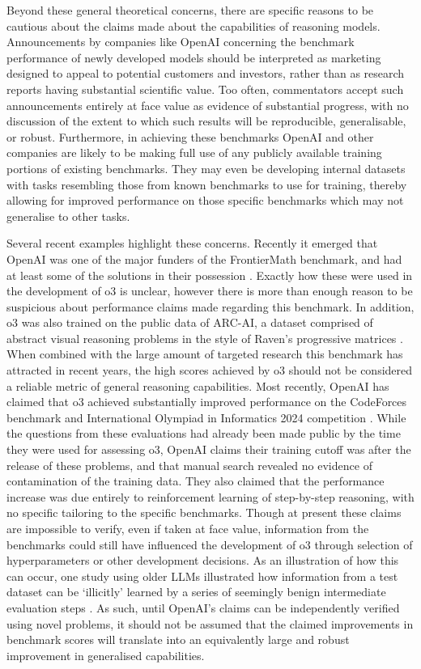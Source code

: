 \documentclass{article}
\begin{document}
Beyond these general theoretical concerns, there are specific reasons to be cautious about the claims made about the capabilities of reasoning models. Announcements by companies like OpenAI concerning the benchmark performance of newly developed models should be interpreted as marketing designed to appeal to potential customers and investors, rather than as research reports having substantial scientific value. Too often, commentators accept such announcements entirely at face value as evidence of substantial progress, with no discussion of the extent to which such results will be reproducible, generalisable, or robust. Furthermore, in achieving these benchmarks OpenAI and other companies are likely to be making full use of any publicly available training portions of existing benchmarks. They may even be developing internal datasets with tasks resembling those from known benchmarks to use for training, thereby allowing for improved performance on those specific benchmarks which may not generalise to other tasks.

Several recent examples highlight these concerns. Recently it emerged that OpenAI was one of the major funders of the FrontierMath benchmark, and had at least some of the solutions in their possession \citep{search2025openai}. Exactly how these were used in the development of o3 is unclear, however there is more than enough reason to be suspicious about performance claims made regarding this benchmark. In addition, o3 was also trained on the public data of ARC-AI, a dataset comprised of abstract visual reasoning problems in the style of Raven’s progressive matrices \citep{chollet2024o3}. When combined with the large amount of targeted research this benchmark has attracted in recent years, the high scores achieved by o3 should not be considered a reliable metric of general reasoning capabilities. Most recently, OpenAI has claimed that o3 achieved substantially improved performance on the CodeForces benchmark and International Olympiad in Informatics 2024 competition \citep{openai2025competitive}. While the questions from these evaluations had already been made public by the time they were used for assessing o3, OpenAI claims their training cutoff was after the release of these problems, and that manual search revealed no evidence of contamination of the training data. They also claimed that the performance increase was due entirely to reinforcement learning of step-by-step reasoning, with no specific tailoring to the specific benchmarks. Though at present these claims are impossible to verify, even if taken at face value, information from the benchmarks could still have influenced the development of o3 through selection of hyperparameters or other development decisions. As an illustration of how this can occur, one study using older LLMs illustrated how information from a test dataset can be `illicitly' learned by a series of seemingly benign intermediate evaluation steps \citep{mansurov2024data}. As such, until OpenAI's claims can be independently verified using novel problems, it should not be assumed that the claimed improvements in benchmark scores will translate into an equivalently large and robust improvement in generalised capabilities.
\end{document}
